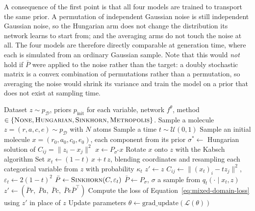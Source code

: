 A consequence of the first point is that all four models are trained to transport the same prior. A
permutation of independent Gaussian noise is still independent Gaussian noise, so the Hungarian arm
does not change the distribution its network learns to start from; and the averaging arms do not
touch the noise at all. The four models are therefore directly comparable at generation time, where
each is simulated from an ordinary Gaussian sample. Note that this would \emph{not} hold if
$\bar{P}$ were applied to the noise rather than the target: a doubly stochastic matrix is a convex
combination of permutations rather than a permutation, so averaging the noise would shrink its
variance and train the model on a prior that does not exist at sampling time.

\begin{algorithm}
\caption{Permutation-Averaged Flow Matching Training}
\label{alg:permutation-averaged-training}
\begin{algorithmic}[1]
\Require Dataset $z \sim p_\mathcal{D}$, priors $p_{\text{init}}$ for each variable, network
    $f^\theta$, method $\in \{\textsc{None}, \textsc{Hungarian}, \textsc{Sinkhorn},
    \textsc{Metropolis}\}$.
    \State Sample a molecule $z = (r, a, c, e) \sim p_\mathcal{D}$ with $N$ atoms
    \State Sample a time $t \sim \mathcal{U}(0,1)$
    \State Sample an initial molecule $x = (r_0, a_0, c_0, e_0)$, each component from its prior
     
        \State $\sigma^* \gets$ Hungarian solution of $C_{ij} = \|z_i - x_j\|^2$
        \State $x \gets P_{\sigma^*} x$
    \EndIf
    \State Rotate $x$ onto $z$ with the Kabsch algorithm
    \State Set $x_t \gets (1-t)\,x + t\,z$, blending coordinates and resampling each categorical
        variable from $z$ with probability $\kappa_t$
    \State $z' \gets z$ 
        \State $C_{ij} \gets \|(x_t)_i - t z_j\|^2$, \quad
            $\varepsilon_t \gets 2(1-t)^2$
            \State $\bar{P} \gets \textsc{Sinkhorn}(C, \varepsilon_t)$
        \Else
            \State $\bar{P} \gets P_\sigma$, $\sigma$ a sample from $q_t(\cdot \mid x_t, z)$
        \EndIf
        \State $z' \gets (\bar{P}r,\; \bar{P}a,\; \bar{P}c,\; \bar{P}e\bar{P}^\top)$
    \EndIf
    \State Compute the loss of Equation~\eqref{eq:mixed-domain-loss} using $z'$ in place of $z$
    \State Update parameters $\theta \gets \mathrm{grad\_update}(\mathcal{L}(\theta))$
\EndFor
\end{algorithmic}
\end{algorithm}

